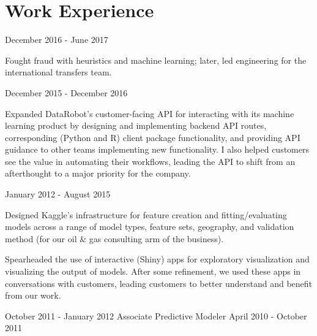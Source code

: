 \documentclass[letterpaper]{resume}
\author{David J. Chudzicki}
\begin{document}
\maketitle

\section{Work Experience}


{December 2016 - June 2017}


\begin{compactitem}
\item Fought fraud with heuristics and machine learning; later, led engineering for the international transfers team.
\end{compactitem}



{December 2015 - December 2016}


\begin{compactitem}
\item Expanded DataRobot's customer-facing API for interacting with its machine learning product by designing and implementing backend API routes, corresponding (Python and R) client package functionality, and providing API guidance to other teams implementing new functionality. I also helped customers see the value in automating their workflows, leading the API to shift from an afterthought to a major priority for the company.
\end{compactitem}


{January 2012 - August 2015}            


\begin{compactitem}
\item Designed Kaggle's infrastructure for feature creation and fitting/evaluating models across a range of model types, feature sets, geography, and validation method (for our oil \& gas consulting arm of the business).
\item Spearheaded the use of interactive (Shiny) apps for exploratory visualization and visualizing the output of models. After some refinement, we used these apps in conversations with customers, leading customers to better understand and benefit from our work.
\end{compactitem}


{October 2011 - January 2012}
{Associate Predictive Modeler}
{April 2010 - October 2011}
\end{document}
